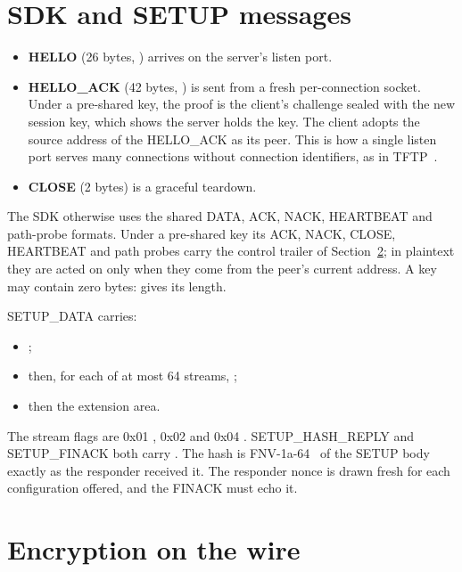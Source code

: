 \section{SDK and SETUP messages}

\begin{itemize}
  \item \textbf{HELLO} (26 bytes, ) arrives on the server's listen port.
  \item \textbf{HELLO\_ACK} (42 bytes, ) is sent from a fresh per-connection socket.
    Under a pre-shared key, the proof is the client's challenge sealed with the new session key, which shows the
    server holds the key. The client adopts the source address of the HELLO\_ACK as its peer. This is how a
    single listen port serves many connections without connection identifiers, as in TFTP~\cite{rfc1350}.
  \item \textbf{CLOSE} (2 bytes) is a graceful teardown.
\end{itemize}

\noindent The SDK otherwise uses the shared DATA, ACK, NACK, HEARTBEAT and path-probe formats. Under a
pre-shared key its ACK, NACK, CLOSE, HEARTBEAT and path probes carry the control trailer of
Section~\ref{sec:wirecrypto}\vviii; in plaintext they are acted on only when they come from the peer's current
address. A key may contain zero bytes:  gives its length.

SETUP\_DATA carries:
\begin{itemize}
  \item {};
  \item then, for each of at most 64 streams, ;
  \item then the extension area\vviii.
\end{itemize}
The stream flags are 0x01 , 0x02  and 0x04 . SETUP\_HASH\_REPLY and
SETUP\_FINACK both carry . The hash is FNV-1a-64~\cite{fnv} of the SETUP body
exactly as the responder received it. The responder nonce\vviii{} is drawn fresh for each configuration offered,
and the FINACK must echo it.

\section{Encryption on the wire}\label{sec:wirecrypto}


